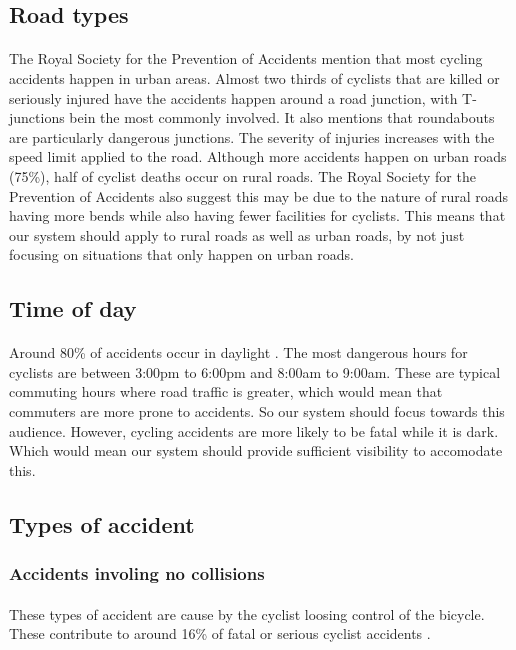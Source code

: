 \documentclass[a4paper]{report}
\begin{document}
{\subsection{Road types}
\paragraph{}The Royal Society for the Prevention of Accidents \cite{cycling_accidents} mention that most cycling accidents happen in urban areas. Almost two thirds of cyclists that are killed or seriously injured have the accidents happen around a road junction, with T-junctions bein the most commonly involved. It also mentions that roundabouts are particularly dangerous junctions. The severity of injuries increases with the speed limit applied to the road. Although more accidents happen on urban roads (75\%), half of cyclist deaths occur on rural roads. The Royal Society for the Prevention of Accidents \cite{rural_road_safety} also suggest this may be due to the nature of rural roads having more bends while also having fewer facilities for cyclists. This means that our system should apply to rural roads as well as urban roads, by not just focusing on situations that only happen on urban roads. 
\subsection{Time of day}
\paragraph{}Around 80\% of accidents occur in daylight \citep{cycling_accidents}. The most dangerous hours for cyclists are between 3:00pm to 6:00pm and 8:00am to 9:00am. These are typical commuting hours where road traffic is greater, which would mean that commuters are more prone to accidents. So our system should focus towards this audience. However, cycling accidents are more likely to be fatal while it is dark. Which would mean our system should provide sufficient visibility to accomodate this.
\subsection{Types of accident}
\subsubsection{Accidents involing no collisions}
\paragraph{}These types of accident are cause by the cyclist loosing control of the bicycle. These contribute to around 16\% of fatal or serious cyclist accidents \citep{cycling_accidents}. 

}
\end{document}
